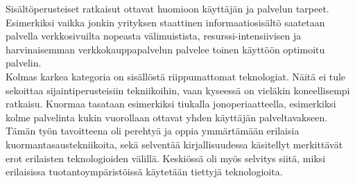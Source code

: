 \documentclass[a4paper, 12pt, finnish]{report}
\begin{document}
Sisältöperusteiset ratkaisut ottavat huomioon käyttäjän ja palvelun tarpeet.
Esimerkiksi vaikka jonkin yrityksen staattinen informaatiosisältö saatetaan palvella verkkosivuilta nopeasta välimuistista,
resurssi-intensiivisen ja harvinaisemman verkkokauppapalvelun palvelee toinen käyttöön optimoitu palvelin.\\

Kolmas karkea kategoria on sisällöstä riippumattomat teknologiat.
Näitä ei tule sekoittaa sijaintiperusteisiin tekniikoihin, vaan kyseessä on vieläkin koneellisempi ratkaisu.
Kuormaa tasataan esimerkiksi tiukalla jonoperiaatteella, esimerkiksi kolme palvelinta kukin vuorollaan ottavat yhden käyttäjän palveltavakseen.\\
	
Tämän työn tavoitteena oli perehtyä ja oppia ymmärtämään erilaisia kuormantasaustekniikoita, sekä selventää kirjallisuudessa käsitellyt merkittävät erot erilaisten teknologioiden välillä.
Keskiössä oli myös selvitys siitä, miksi erilaisissa tuotantoympäristöissä käytetään tiettyjä teknologioita.\\
	
\end{document}
